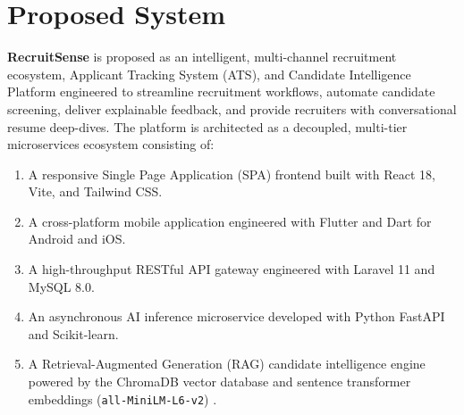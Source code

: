 \section{Proposed System}
\textbf{RecruitSense} is proposed as an intelligent, multi-channel recruitment ecosystem, Applicant Tracking System (ATS), and Candidate Intelligence Platform engineered to streamline recruitment workflows, automate candidate screening, deliver explainable feedback, and provide recruiters with conversational resume deep-dives. The platform is architected as a decoupled, multi-tier microservices ecosystem consisting of:
\begin{enumerate}
    \item A responsive Single Page Application (SPA) frontend built with React 18, Vite, and Tailwind CSS.
    \item A cross-platform mobile application engineered with Flutter and Dart for Android and iOS.
    \item A high-throughput RESTful API gateway engineered with Laravel 11 and MySQL 8.0.
    \item An asynchronous AI inference microservice developed with Python FastAPI and Scikit-learn.
    \item A Retrieval-Augmented Generation (RAG) candidate intelligence engine powered by the ChromaDB vector database and sentence transformer embeddings (\texttt{all-MiniLM-L6-v2}) \cite{lewis2020rag, malkov2018hnsw}.
\end{enumerate}


